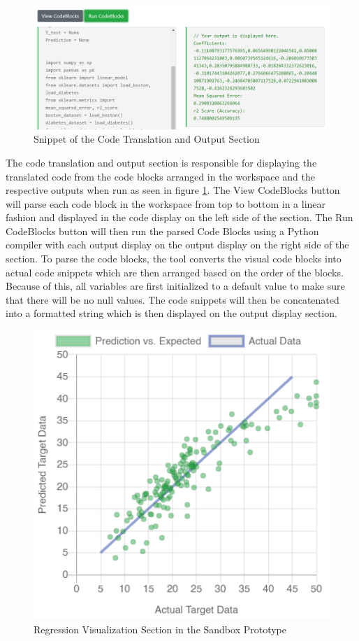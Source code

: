 \documentclass{sigchi}
\begin{document}
\begin{figure}[]
    \centering
    \includegraphics[width = 1 \columnwidth]{figures/Code_Output}
    \caption{Snippet of the Code Translation and Output Section}
    \label{fig:codeout}
\end{figure}

The code translation and output section is responsible for displaying the translated code from the code blocks arranged in the workspace and the respective outputs when run as seen in figure \ref{fig:codeout}. The View CodeBlocks button will parse each code block in the workspace from top to bottom in a linear fashion and displayed in the code display on the left side of the section. The Run CodeBlocks button will then run the parsed Code Blocks using a Python compiler with each output display on the output display on the right side of the section. To parse the code blocks, the tool converts the visual code blocks into actual code snippets which are then arranged based on the order of the blocks. Because of this, all variables are first initialized to a default value to make sure that there will be no null values. The code snippets will then be concatenated into a formatted string which is then displayed on the output display section.

\begin{figure}[t]
    \centering
    \includegraphics[width = 1 \columnwidth]{figures/Reg_Vis}
    \caption{Regression Visualization Section in the Sandbox Prototype}
    \label{fig:regvis}
\end{figure}
\end{document}
